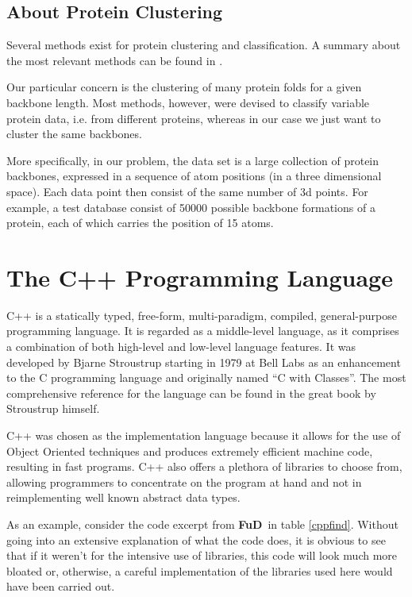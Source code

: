 \documentclass[a4paper,12pt,english]{report}
\newcommand{\fud}{\textbf{FuD}}
\begin{document}
\subsection{About Protein Clustering}

Several methods exist for protein clustering and classification. A summary about the most relevant methods can be found in \cite{proteinclustering}. 

Our particular concern is the clustering of many protein folds for a given backbone length. Most methods, however, were devised to classify variable protein data, i.e. from different proteins, whereas in our case we just want to cluster the same backbones.

More specifically, in our problem, the data set is a large collection of protein backbones, expressed in a sequence of atom positions (in a three dimensional space). Each data point then consist of the same number of 3d points. For example, a test database consist of 50000 possible backbone formations of a protein, each of which carries the position of 15 atoms.

\section{The C++ Programming Language}

C++ is a statically typed, free-form, multi-paradigm, compiled, general-purpose programming language. It is regarded as a middle-level language, as it comprises a combination of both high-level and low-level language features. It was developed by Bjarne Stroustrup starting in 1979 at Bell Labs as an enhancement to the C programming language and originally named ``C with Classes''. The most comprehensive reference for the language can be found in the great book by Stroustrup himself\cite{cplusplus}.

C++ was chosen as the implementation language because it allows for the use of Object Oriented techniques and produces extremely efficient machine code, resulting in fast programs. C++ also offers a plethora of libraries to choose from, allowing programmers to concentrate on the program at hand and not in reimplementing well known abstract data types.

As an example, consider the code excerpt from \fud \ in table \ref{cppfind}. Without going into an extensive explanation of what the code does, it is obvious to see that if it weren't for the intensive use of libraries, this code will look much more bloated or, otherwise, a careful implementation of the libraries used here would have been carried out.  
\end{document}
